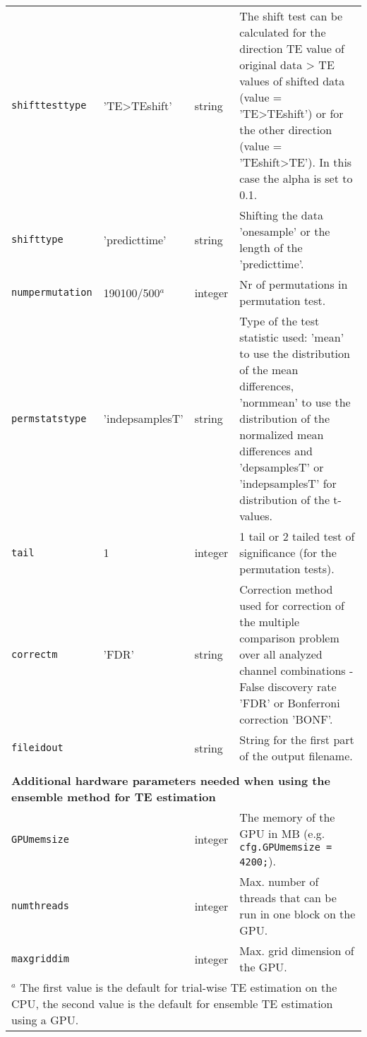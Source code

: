 \begin{table}[H]
{\begin{tabularx}{1.1\textwidth}{p{2cm}p{2cm}p{1.1cm}X}
\verb+shifttesttype+ & 'TE>TEshift' & string & The shift test can be calculated for the direction TE value of original data > TE values of shifted data (value = 'TE>TEshift') or for the other direction (value = 'TEshift>TE'). In this case the alpha is set to 0.1.\\
\rowcolor{Gray}
\verb+shifttype+ & 'predicttime'& string & Shifting the data 'onesample' or the length of the 
'predicttime'. \\
\verb+numpermutation+ & 190100/500$^a$ & integer & Nr of permutations in permutation test.\\
\rowcolor{Gray}
\verb+permstatstype+  & 'indepsamplesT' & string & Type of the test statistic used: 'mean' to use the distribution of the mean differences, 'normmean' to use the distribution of the normalized mean differences and 'depsamplesT' or 'indepsamplesT' for distribution of the t-values.\\
\verb+tail+ & 1 & integer & 1 tail or 2 tailed test of significance (for the permutation tests).\\
\rowcolor{Gray}
\verb+correctm+ & 'FDR' & string & Correction method used for correction of the multiple comparison problem over all analyzed channel combinations - False discovery rate 'FDR' or Bonferroni correction 'BONF'.\\
\verb+fileidout+ & & string & String for the first part of the output filename.\\
\multicolumn{4}{l}{}\\
\multicolumn{4}{l}{\textbf{Additional hardware parameters needed when using the ensemble method for TE estimation}}\\ \midrule
\rowcolor{Gray}
\verb+GPUmemsize+ & & integer & The memory of the GPU in MB (e.g. \verb+cfg.GPUmemsize = 4200;+). \\
\verb+numthreads+ & & integer & Max. number of threads that can be run in one block on the GPU. \\
\rowcolor{Gray}
\verb+maxgriddim+ & & integer & Max. grid dimension of the GPU. \\
\bottomrule
\multicolumn{4}{p{\textwidth}}{$^a$ The first value is the default for trial-wise TE estimation on the CPU, the second value is the default for ensemble TE estimation using a GPU.}
\end{tabularx}} \label{tab:cfgTESS}
\end{table}